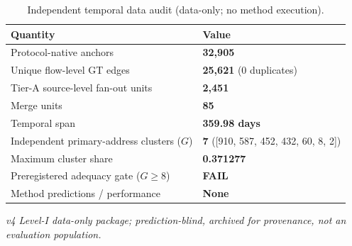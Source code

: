 \begin{table}[!t]
\caption{Independent temporal data audit (data-only; no method execution).}
\label{tab:v4}
\centering
\footnotesize
\begin{tabular}{L{0.56\columnwidth}p{0.34\columnwidth}}
\toprule
Quantity & Value \\
\midrule
Protocol-native anchors & \textbf{32{,}905} \\
Unique flow-level GT edges & \textbf{25{,}621} (0 duplicates) \\
Tier-A source-level fan-out units & \textbf{2{,}451} \\
Merge units & \textbf{85} \\
Temporal span & \textbf{359.98 days} \\
Independent primary-address clusters ($G$) & \textbf{7} ([910, 587, 452, 432, 60, 8, 2]) \\
Maximum cluster share & \textbf{0.371277} \\
Preregistered adequacy gate ($G \ge 8$) & \textbf{FAIL} \\
Method predictions / performance & \textbf{None} \\
\bottomrule
\end{tabular}
\end{table}

\emph{v4 Level-I data-only package; prediction-blind, archived for provenance, not an evaluation population.}
